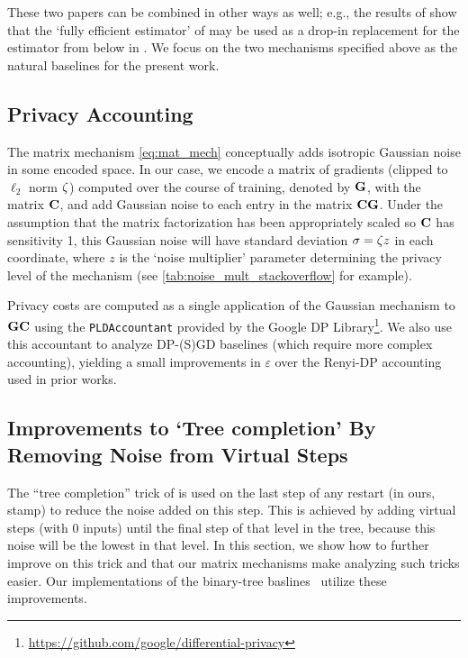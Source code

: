 \documentclass{article} %
\theoremstyle{named}
\begin{document}
These two papers can be combined in other ways as well; e.g., the results of \citet{denisov22matfact} show that the `fully efficient estimator' of \citet{honaker_trick} may be used as a drop-in replacement for the estimator from below in \citet{kairouz2021practical}. We focus on the two mechanisms specified above as the natural baselines for the present work.


\subsection{Privacy Accounting}\label{app:ssec:privacy-accounting}
\newcommand{\nmult}{z}
\newcommand{\cpr}{K}
The matrix mechanism \cref{eq:mat_mech} conceptually adds isotropic Gaussian noise in some encoded space. In our case, we encode a matrix of gradients (clipped to $\ell_2$ norm $\zeta$) computed over the course of training, denoted by $\mathbf{G}$, with the matrix $\mathbf{C}$, and add Gaussian noise to each entry in the matrix $\mathbf{C} \mathbf{G}$. Under the assumption that the matrix factorization has been appropriately scaled so $\mathbf{C}$ has sensitivity 1, this Gaussian noise will have standard deviation $\sigma = \clipnorm \nmult$ in each coordinate, where $\nmult$ is the `noise multiplier' parameter determining the privacy level of the mechanism (see \cref{tab:noise_mult_stackoverflow} for example).

Privacy costs are computed as a single application of the Gaussian mechanism to $\mathbf{G} \mathbf{C}$ using the \texttt{PLDAccountant} provided by the Google DP Library\footnote{\url{https://github.com/google/differential-privacy}}. We also use this accountant to analyze DP-(S)GD baselines (which require more complex accounting), yielding a small improvements in $\varepsilon$ over the Renyi-DP accounting used in prior works.

\subsection{Improvements to `Tree completion' By Removing Noise from Virtual Steps}\label{app:ssec:tree_completion}
The ``tree completion'' trick of \citet{kairouz2021practical} is used on the last step of any restart (in ours, stamp) to reduce the noise added on this step. This is achieved by adding virtual steps (with 0 inputs) until the final step of that level in the tree, because this noise will be the lowest in that level. In this section, we show how to further improve on this trick and that our matrix mechanisms make analyzing such tricks easier. Our implementations of the binary-tree baslines~\citet{honaker_trick,kairouz2021practical} utilize these improvements.
\end{document}
